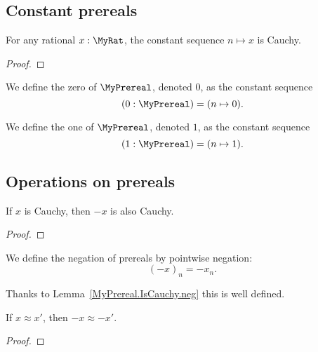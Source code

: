 \subsection{Constant prereals}

\begin{lemma}
    \label{MyPrereal.IsCauchy.const}
    \leanok
    For any rational $x : \MyRat$, the constant sequence $n \mapsto x$ is Cauchy.
\end{lemma}
\begin{proof}
    \leanok
\end{proof}

\begin{definition}
    \label{MyPrereal.zero}
    \leanok
    We define the zero of $\MyPrereal$, denoted $0$, as the constant sequence
    \[
    (0 : \MyPrereal) = (n \mapsto 0).
    \]
\end{definition}

\begin{definition}
    \label{MyPrereal.one}
    \leanok
    We define the one of $\MyPrereal$, denoted $1$, as the constant sequence
    \[
    (1 : \MyPrereal) = (n \mapsto 1).
    \]
\end{definition}

\subsection{Operations on prereals}

\begin{lemma}
    \label{MyPrereal.IsCauchy.neg}
    \leanok
    If $x$ is Cauchy, then $-x$ is also Cauchy.
\end{lemma}
\begin{proof}
    \leanok
\end{proof}

\begin{definition}
    \label{MyPrereal.neg}
    \leanok
    We define the negation of prereals by pointwise negation:
    \[
    (-x)_n = -x_n.
    \]

    Thanks to Lemma~\ref{MyPrereal.IsCauchy.neg} this is well defined.
\end{definition}

\begin{lemma}
    \label{MyPrereal.neg_quotient}
    \leanok
    If $x \approx x'$, then $-x \approx -x'$.
\end{lemma}
\begin{proof}
    \leanok
\end{proof}

